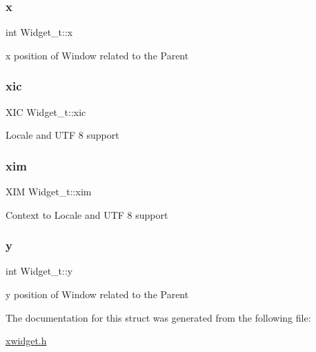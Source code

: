 \subsubsection{\texorpdfstring{x}{x}}
{\footnotesize\ttfamily int Widget\+\_\+t\+::x}

x position of Window related to the Parent \mbox{\label{structWidget__t_adafb1b98ea551ef726be6c726ac2e817}} 
\subsubsection{\texorpdfstring{xic}{xic}}
{\footnotesize\ttfamily X\+IC Widget\+\_\+t\+::xic}

Locale and U\+TF 8 support \mbox{\label{structWidget__t_a81aa76d336043a7230844d09a92113e2}} 
\subsubsection{\texorpdfstring{xim}{xim}}
{\footnotesize\ttfamily X\+IM Widget\+\_\+t\+::xim}

Context to Locale and U\+TF 8 support \mbox{\label{structWidget__t_acb9402de44e47837e1821b93fc052b38}} 
\subsubsection{\texorpdfstring{y}{y}}
{\footnotesize\ttfamily int Widget\+\_\+t\+::y}

y position of Window related to the Parent 

The documentation for this struct was generated from the following file\+:\begin{DoxyCompactItemize}
\item 
\hyperlink{xwidget_8h}{xwidget.\+h}\end{DoxyCompactItemize}
